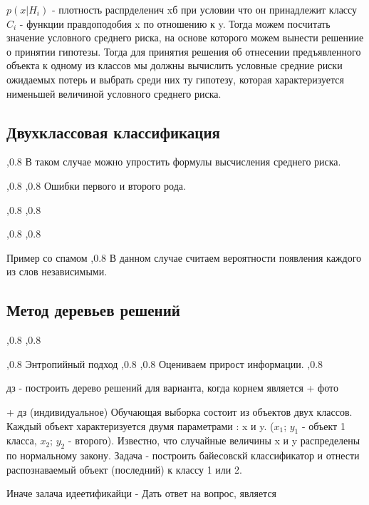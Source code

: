 \documentclass[a4paper,12pt]{report}
\begin{document}
		$p(x|H_i)$ - плотность распрделенич xб при условии что он принадлежит классу $C_i$ - функции правдоподобия x по отношению к y.
		Тогда можем посчитать значение условного среднего риска, на основе которого можем вынести решениие о принятии гипотезы. Тогда для принятия решения об отнесении предъявленного объекта к одному из классов мы должны вычислить условные средние риски ожидаемых потерь и выбрать среди них ту гипотезу, которая характеризуется нименьшей величиной условного среднего риска.

	\subsection{Двухклассовая классификация}
		,0.8
		В таком случае можно упростить формулы высчисления среднего риска.

		,0.8
		,0.8
		Ошибки первого и второго рода.

		,0.8
		,0.8

		,0.8
		,0.8 %

		Пример со спамом
		,0.8
		В данном случае считаем вероятности появления каждого из слов независимыми.

	\subsection{Метод деревьев решений}
		,0.8
		,0.8

		,0.8 %
		Энтропийный подход
		,0.8
		,0.8
		Оцениваем прирост информации.
		,0.8

		дз - построить дерево решений для варианта, когда корнем является + фото

		+ дз (индивидуальное)
		Обучающая выборка состоит из объектов двух классов. Каждый объект характеризуется двумя параметрами : x и y. ($x_1$; $y_1$ - объект 1 класса, $x_2$; $y_2$ - второго). Известно, что случайные величины x и y распределены по нормальному закону. Задача - построить байесовскй классификатор и отнести распознаваемый объект (последний) к классу 1 или 2.





Иначе залача идеетификайци - Дать ответ на вопрос, является 
\end{document}
